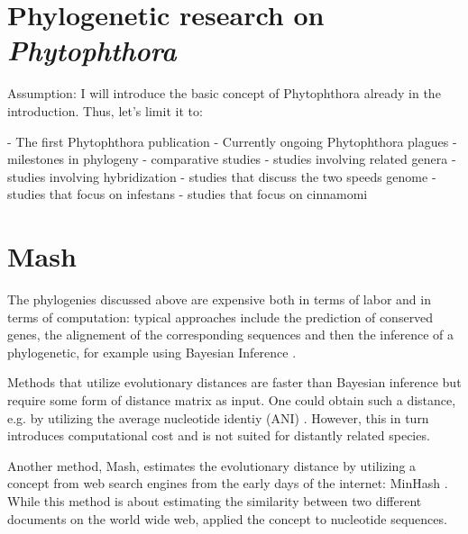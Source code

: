 \section{Phylogenetic research on \textit{Phytophthora}} Assumption: I will
introduce the basic concept of Phytophthora already in the introduction. Thus,
let's limit it to:

- The first Phytophthora publication 
- Currently ongoing Phytophthora plagues 
- milestones in phylogeny
\cite{pkroonGenusPhytophthoraAnno2012,yangExpandedPhylogenyGenus2017,abadPhytophthoraTaxonomicPhylogenetic2023a}
- comparative studies \cite{mandalComparativeGenomeAnalysis2022,catalaUseGenusSpecificAmplicon2015}
- studies involving related genera \cite{winkworthComparativeAnalysesComplete2022,navarroComparisonSpeciesCommunities2021}
- studies involving hybridization \cite{vanpouckeUnravellingHybridizationPhytophthora2021}
- studies that discuss the two speeds genome \cite{dongTwospeedGenomesFilamentous2015}
- studies that focus on infestans \cite{ayala-usmaWholeGenomeDuplication2021,raffaeleAnalysesGenomeArchitecture2010}
- studies that focus on cinnamomi \cite{solis-garciaPhytophthoraRootRot2020}


\section{Mash}
The phylogenies discussed above are expensive both in terms of labor and in
terms of computation: typical approaches include the prediction of conserved
genes, the alignement of the corresponding sequences and then the inference of a
phylogenetic, for example using Bayesian Inference
\cite{abadPhytophthoraTaxonomicPhylogenetic2023a,winkworthComparativeAnalysesComplete2022}.

Methods that utilize evolutionary distances
\cite{saitouNeighborjoiningMethodNew1987} are faster  than Bayesian
inference but require some form of distance matrix as input. One could obtain
such a distance, e.g. by utilizing the average nucleotide identiy (ANI)
\cite{leeOrthoANIImprovedAlgorithm2016}. However, this in turn introduces
computational cost and is not suited for distantly related species.

Another method, Mash, estimates the evolutionary distance by utilizing a concept
from web search engines from the early days of the internet: MinHash
\cite{broderResemblanceContainmentDocuments1998a,ondovMashFastGenome2016}. While
this method is about estimating the similarity between two different documents
on the world wide web,  applied the concept
to nucleotide sequences.

